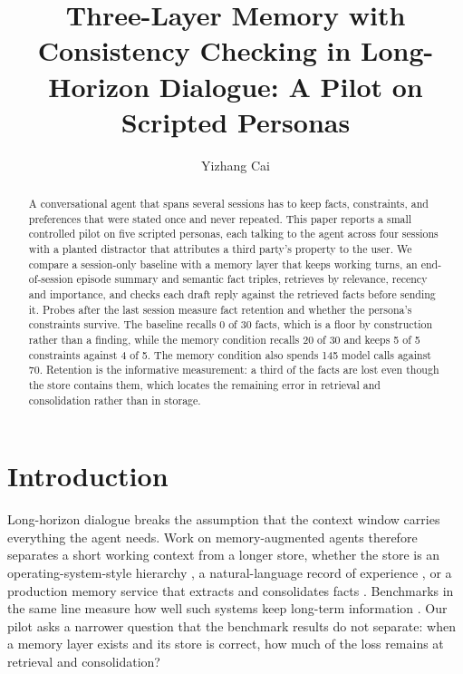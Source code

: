 \documentclass[runningheads,a4paper]{llncs}
\begin{document}
\title{Three-Layer Memory with Consistency Checking in Long-Horizon Dialogue: A Pilot on Scripted Personas}


\author{Yizhang Cai}



\maketitle

\begin{abstract}

A conversational agent that spans several sessions has to keep facts, constraints, and preferences that were stated once and never repeated. This paper reports a small controlled pilot on five scripted personas, each talking to the agent across four sessions with a planted distractor that attributes a third party's property to the user. We compare a session-only baseline with a memory layer that keeps working turns, an end-of-session episode summary and semantic fact triples, retrieves by relevance, recency and importance, and checks each draft reply against the retrieved facts before sending it. Probes after the last session measure fact retention and whether the persona's constraints survive. The baseline recalls 0 of 30 facts, which is a floor by construction rather than a finding, while the memory condition recalls 20 of 30 and keeps 5 of 5 constraints against 4 of 5. The memory condition also spends 145 model calls against 70. Retention is the informative measurement: a third of the facts are lost even though the store contains them, which locates the remaining error in retrieval and consolidation rather than in storage.


\end{abstract}

\section{Introduction}

Long-horizon dialogue breaks the assumption that the context window carries everything the agent needs. Work on memory-augmented agents therefore separates a short working context from a longer store, whether the store is an operating-system-style hierarchy \cite{debenedetti2024agentdojo}, a natural-language record of experience \cite{struq2024}, or a production memory service that extracts and consolidates facts \cite{conformal2021}. Benchmarks in the same line measure how well such systems keep long-term information \cite{acps2026repo,interop2025}. Our pilot asks a narrower question that the benchmark results do not separate: when a memory layer exists and its store is correct, how much of the loss remains at retrieval and consolidation?
\end{document}
